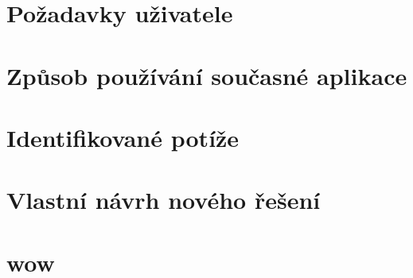 \documentclass[a4paper, 11pt, twocolumn]{article}
\theoremstyle{definition}
\theoremstyle{plain}
\begin{document}
	\section*{Požadavky uživatele}

	\section*{Způsob používání současné aplikace}

	\section*{Identifikované potíže}

	\section*{Vlastní návrh nového řešení}


	\newpage



	
	\section*{wow}	
\end{document}
